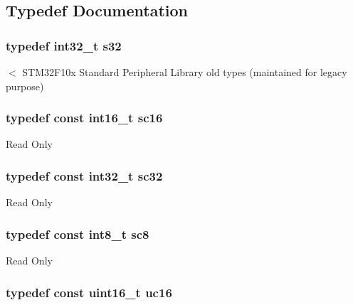 \subsection{Typedef Documentation}
\hypertarget{group___exported__types_gae9b1af5c037e57a98884758875d3a7c4}{
\subsubsection[{s32}]{\setlength{\rightskip}{0pt plus 5cm}typedef int32\-\_\-t {\bf s32}}}\label{group___exported__types_gae9b1af5c037e57a98884758875d3a7c4}
$<$ S\-T\-M32\-F10x Standard Peripheral Library old types (maintained for legacy purpose) \hypertarget{group___exported__types_ga66ab742a0751bb4e7661b8e874f2ddda}{
\subsubsection[{sc16}]{\setlength{\rightskip}{0pt plus 5cm}typedef const int16\-\_\-t {\bf sc16}}}\label{group___exported__types_ga66ab742a0751bb4e7661b8e874f2ddda}
Read Only \hypertarget{group___exported__types_gad97679599f3791409523fdb1c6156a28}{
\subsubsection[{sc32}]{\setlength{\rightskip}{0pt plus 5cm}typedef const int32\-\_\-t {\bf sc32}}}\label{group___exported__types_gad97679599f3791409523fdb1c6156a28}
Read Only \hypertarget{group___exported__types_ga30e6c0f6718e1b6d26dc9d94ddcf9d11}{
\subsubsection[{sc8}]{\setlength{\rightskip}{0pt plus 5cm}typedef const int8\-\_\-t {\bf sc8}}}\label{group___exported__types_ga30e6c0f6718e1b6d26dc9d94ddcf9d11}
Read Only \hypertarget{group___exported__types_gabc715ea3779494b5a4f53173a397f7cb}{
\subsubsection[{uc16}]{\setlength{\rightskip}{0pt plus 5cm}typedef const uint16\-\_\-t {\bf uc16}}}\label{group___exported__types_gabc715ea3779494b5a4f53173a397f7cb}
